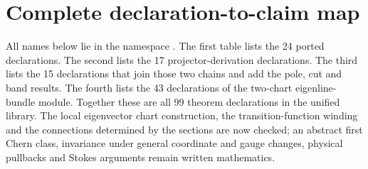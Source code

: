 \documentclass[11pt]{article}
\theoremstyle{definition}\newtheorem{definition}[theorem]{Definition}
\theoremstyle{remark}\newtheorem{remark}[theorem]{Remark}
\newcommand{\leanname}[1]{\texttt{\small\detokenize{#1}}}
\begin{document}
\clearpage
\appendix
\section{Complete declaration-to-claim map}\label{sec:map}
All names below lie in the namespace \leanname{MonopoleStance}. The first table lists the 24 ported declarations. The second lists the 17 projector-derivation declarations. The third lists the 15 declarations that join those two chains and add the pole, cut and band results. The fourth lists the 43 declarations of the two-chart eigenline-bundle module. Together these are all 99 theorem declarations in the unified library. The local eigenvector chart construction, the transition-function winding and the connections determined by the sections are now checked; an abstract first Chern class, invariance under general coordinate and gauge changes, physical pullbacks and Stokes arguments remain written mathematics.
\end{document}
